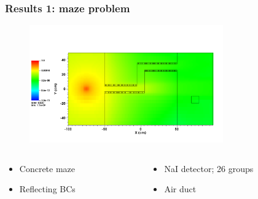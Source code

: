\documentclass[handout]{beamer}
\renewcommand{\(}{\begin{columns}}
\renewcommand{\)}{\end{columns}}
\newcommand{\<}[1]{\begin{column}{#1}}
\renewcommand{\>}{\end{column}}
\begin{document}
\begin{frame}[fragile]

  \frametitle{Results 1: maze problem}
   \begin{figure}
   \includegraphics[height=2in,clip]{maze2_forward_group00_adjusted.png}
   \end{figure}

\begin{columns}
   \begin{column}{0.45\textwidth}
   \begin{itemize}
\item Concrete maze
\item Reflecting BCs
\end{itemize}
   \end{column}
  \begin{column}{0.5\textwidth}
   \begin{itemize}
\item NaI detector; 26 groups
\item Air duct
\end{itemize}
   \end{column}
\end{columns}
	
\end{frame}
\end{document}
